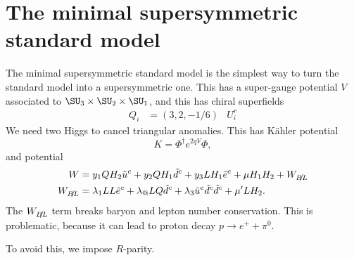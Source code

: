 \documentclass[a4paper]{article}
\begin{document}
\section{The minimal supersymmetric standard model}
The minimal supersymmetric standard model is the simplest way to turn the standard model into a supersymmetric one. This has a super-gauge potential $V$ associated to $\SU_3 \times \SU_2 \times \SU_1$, and this has chiral superfields
\begin{align*}
  Q_i &= (3, 2, -1/6) & U_i^r %
\end{align*}
We need two Higgs to cancel triangular anomalies. This has K\"ahler potential
\[
  K = \Phi^\dagger e^{2qV} \Phi,
\]
and potential
\begin{align*}
  W &= y_1 Q H_2 \tilde{u}^c + y_2 Q H_1 \tilde{d}^c + y_3 L H_1 \tilde{e}^c + \mu H_1 H_2 + W_{\slashed{BL}}\\
  W_{\slashed{BL}} &= \lambda_1 LL \tilde{e}^c + \lambda_@ L Q \tilde{d}^c + \lambda_3 \tilde{u}^e \tilde{d}^c \tilde{d}^c + \mu' LH_2.
\end{align*}
The $W_{\slashed{BL}}$ term breaks baryon and lepton number conservation. This is problematic, because it can lead to proton decay $p \to e^+ + \pi^0$. %

To avoid this, we impose $R$-parity.
\end{document}

